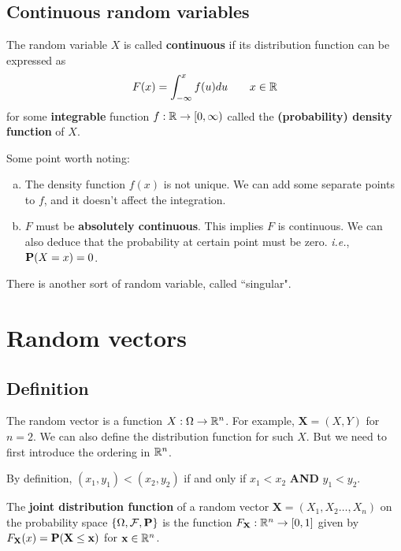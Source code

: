 \subsection{Continuous random variables}
\begin{definition}
The random variable $X$ is called \textbf{continuous} if its distribution function can 
be expressed as 
\begin{equation*}
    F(x) = \int_{-\infty}^x f(u) du \qquad x \in \mathbb{R}
\end{equation*}
for some \textbf{integrable} function $f : \mathbb{R} \to [0, \infty)$ called the \textbf{(probability) density function} of $X$. 
\end{definition}
Some point worth noting:
\begin{enumerate}[(a)]
    \item The density function $f(x)$ is not unique. We can add some separate points to $f$, and it doesn't affect the integration.
    \item $F$ must be \textbf{absolutely continuous}. This implies $F$ is continuous. We can also deduce that the probability at certain point must be zero. \emph{i.e.}, $\mathbf{P}(X=x) = 0$.
\end{enumerate}

There is another sort of random variable, called ``singular".


\section{Random vectors}
\subsection{Definition}
The random vector is a function $X : \Omega \to \mathbb{R}^n$. For example, $\mathbf{X} = (X, Y)$ for $n=2$. We can also define the distribution function for such $X$. But we need to first introduce the ordering in $\mathbb{R}^n$.
\begin{center}
    By definition, $(x_1, y_1) < (x_2, y_2)$ if and only if $x_1 < x_2$  \textbf{AND}  $y_1 < y_2$.
\end{center}

\begin{definition}
The \textbf{joint distribution function} of a random vector $\mathbf{X} = (X_1, X_2 \dots, X_n)$ on the probability space $\{ \Omega, \mathcal{F}, \mathbf{P} \}$ is the function $F_{\mathbf{X}} : \mathbb{R}^n \to [0, 1]$ given by $F_{\mathbf{X}}(x) = \mathbf{P}(\mathbf{X} \leq \mathbf{x})$ for $\mathbf{x} \in \mathbb{R}^n$. 
\end{definition}

